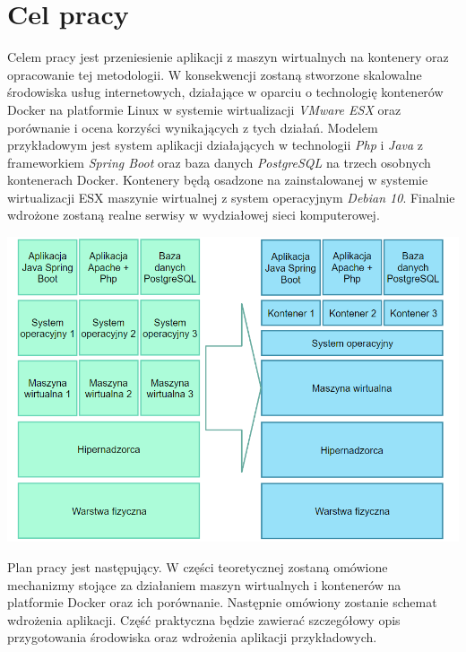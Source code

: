 \documentclass[polish, a4paper, 12pt, oneside]{book}
\begin{document}
	\section{Cel pracy}
	Celem pracy jest przeniesienie aplikacji z maszyn wirtualnych na kontenery oraz opracowanie tej metodologii. W konsekwencji zostaną stworzone skalowalne środowiska usług internetowych, działające w oparciu o technologię kontenerów Docker na platformie Linux w systemie wirtualizacji \textit{VMware ESX}\cite{vmwareesx} oraz porównanie i ocena korzyści wynikających z tych działań. Modelem przykładowym jest system aplikacji działających w technologii \textit{Php}\cite{php} i \textit{Java}\cite{java} z frameworkiem \textit{Spring Boot}\cite{springboot} oraz baza danych \textit{PostgreSQL}\cite{postgresql} na trzech osobnych kontenerach Docker. Kontenery będą osadzone na zainstalowanej w systemie wirtualizacji ESX maszynie wirtualnej z system operacyjnym \textit{Debian 10}\cite{debian10}. Finalnie wdrożone zostaną realne serwisy w wydziałowej sieci komputerowej.\\
	\begin{center}
		\includegraphics[width=160mm]{schemat_proj.png}
	\end{center}
	
	Plan pracy jest następujący. W części teoretycznej zostaną omówione mechanizmy stojące za działaniem maszyn wirtualnych i kontenerów na platformie Docker oraz ich porównanie. Następnie omówiony zostanie schemat wdrożenia aplikacji. Część praktyczna będzie zawierać szczegółowy opis przygotowania środowiska oraz wdrożenia aplikacji przykładowych.
	
\end{document}
